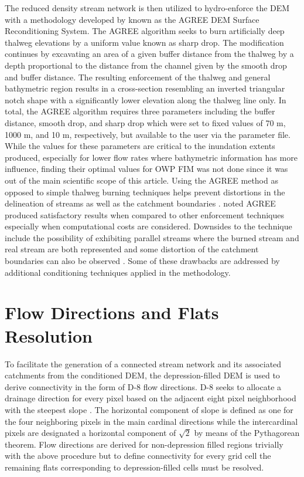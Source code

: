 \documentclass[draft]{dependencies/agujournal2019}
\begin{document}
The reduced density stream network is then utilized to hydro-enforce the DEM with a methodology developed by  known as the AGREE DEM Surface Reconditioning System. 
The AGREE algorithm seeks to burn artificially deep thalweg elevations by a uniform value known as sharp drop. 
The modification continues by excavating an area of a given buffer distance from the thalweg by a depth proportional to the distance from the channel given by the smooth drop and buffer distance. 
The resulting enforcement of the thalweg and general bathymetric region results in a cross-section resembling an inverted triangular notch shape with a significantly lower elevation along the thalweg line only.
In total, the AGREE algorithm requires three parameters including the buffer distance, smooth drop, and sharp drop which were set to fixed values of 70 m, 1000 m, and 10 m, respectively, but available to the user via the parameter file.
While the values for these parameters are critical to the inundation extents produced, especially for lower flow rates where bathymetric information has more influence, finding their optimal values for OWP FIM was not done since it was out of the main scientific scope of this article.
Using the AGREE method as opposed to simple thalweg burning techniques helps prevent distortions in the delineation of streams as well as the catchment boundaries \cite{saunders1995grid,saunders1996gis,mizgalewicz1996modeling,hellweger1997agree,quenzer1998gis,baker2006comparison}.
 noted AGREE produced satisfactory results when compared to other enforcement techniques especially when computational costs are considered. 
Downsides to the technique include the possibility of exhibiting parallel streams where the burned stream and real stream are both represented \cite{hellweger1997agree,saunders1999preparation} and some distortion of the catchment boundaries can also be observed \cite{saunders1999preparation,saunders1996gis}.
Some of these drawbacks are addressed by additional conditioning techniques applied in the methodology.
\section{Flow Directions and Flats Resolution}
\label{sec:app_flow_direction_and_flat_resolution}
%
To facilitate the generation of a connected stream network and its associated catchments from the conditioned DEM, the depression-filled DEM is used to derive connectivity in the form of D-8 flow directions.
D-8 seeks to allocate a drainage direction for every pixel based on the adjacent eight pixel neighborhood with the steepest slope \cite{o1984extraction}.
The horizontal component of slope is defined as one for the four neighboring pixels in the main cardinal directions while the intercardinal pixels are designated a horizontal component of $\sqrt{2}$ by means of the Pythagorean theorem. 
Flow directions are derived for non-depression filled regions trivially with the above procedure but to define connectivity for every grid cell the remaining flats corresponding to depression-filled cells must be resolved.
\end{document}
